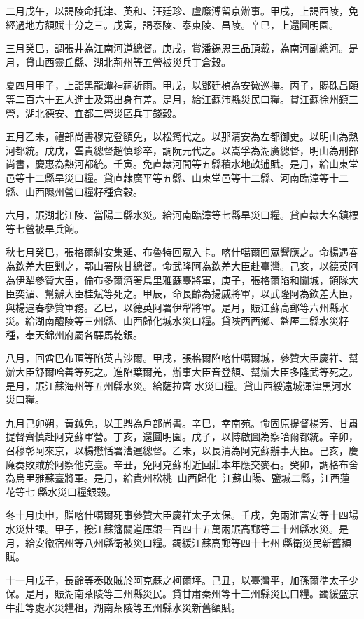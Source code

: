 \begin{pinyinscope}
二月戊午，以謁陵命托津、英和、汪廷珍、盧廕溥留京辦事。甲戌，上謁西陵，免經過地方額賦十分之三。戊寅，謁泰陵、泰東陵、昌陵。辛巳，上還圓明園。

三月癸巳，調張井為江南河道總督。庚戌，賞潘錫恩三品頂戴，為南河副總河。是月，貸山西靈丘縣、湖北荊州等五營被災兵丁倉穀。

夏四月甲子，上詣黑龍潭神祠祈雨。甲戌，以鄧廷楨為安徽巡撫。丙子，賜硃昌頤等二百六十五人進士及第出身有差。是月，給江蘇沛縣災民口糧。貸江蘇徐州鎮三營，湖北德安、宜都二營災區兵丁錢穀。

五月乙未，禮部尚書穆克登額免，以松筠代之。以那清安為左都御史。以明山為熱河都統。戊戌，雲貴總督趙慎畛卒，調阮元代之。以嵩孚為湖廣總督，明山為刑部尚書，慶惠為熱河都統。壬寅。免直隸河間等五縣積水地畝逋賦。是月，給山東堂邑等十二縣旱災口糧。貸直隸廣平等五縣、山東堂邑等十二縣、河南臨漳等十二縣、山西隰州營口糧籽種倉穀。

六月，賑湖北江陵、當陽二縣水災。給河南臨漳等七縣旱災口糧。貸直隸大名鎮標等七營被旱兵餉。

秋七月癸巳，張格爾糾安集延、布魯特回眾入卡。喀什噶爾回眾響應之。命楊遇春為欽差大臣剿之，鄂山署陜甘總督。命武隆阿為欽差大臣赴臺灣。己亥，以德英阿為伊犁參贊大臣，倫布多爾濟署烏里雅蘇臺將軍，庚子，張格爾陷和闐城，領隊大臣奕湄、幫辦大臣桂斌等死之。甲辰，命長齡為揚威將軍，以武隆阿為欽差大臣，與楊遇春參贊軍務。乙巳，以德英阿署伊犁將軍。是月，賑江蘇高郵等六州縣水災。給湖南醴陵等三州縣、山西歸化城水災口糧。貸陜西西鄉、盩厔二縣水災籽種，奉天錦州府屬各驛馬乾銀。

八月，回酋巴布頂等陷英吉沙爾。甲戌，張格爾陷喀什噶爾城，參贊大臣慶祥、幫辦大臣舒爾哈善等死之。進陷葉爾羌，辦事大臣音登額、幫辦大臣多隆武等死之。是月，賑江蘇海州等五州縣水災。給薩拉齊水災口糧。貸山西綏遠城渾津黑河水災口糧。

九月己卯朔，黃鉞免，以王鼎為戶部尚書。辛巳，幸南苑。命固原提督楊芳、甘肅提督齊慎赴阿克蘇軍營。丁亥，還圓明園。戊子，以博啟圖為察哈爾都統。辛卯，召穆彰阿來京，以楊懋恬署漕運總督。乙未，以長清為阿克蘇辦事大臣。己亥，慶廉奏敗賊於阿察他克臺。辛丑，免阿克蘇附近回莊本年應交麥石。癸卯，調格布舍為烏里雅蘇臺將軍。是月，給貴州松桃，山西歸化，江蘇山陽、鹽城二縣，江西蓮花等七縣水災口糧銀穀。

冬十月庚申，贈喀什噶爾死事參贊大臣慶祥太子太保。壬戌，免兩淮富安等十四場水災灶課。甲子，撥江蘇籓關道庫銀一百四十五萬兩賑高郵等二十州縣水災。是月，給安徽宿州等八州縣衛被災口糧。蠲緩江蘇高郵等四十七州縣衛災民新舊額賦。

十一月戊子，長齡等奏敗賊於阿克蘇之柯爾坪。己丑，以臺灣平，加孫爾準太子少保。是月，賑湖南茶陵等三州縣災民。貸甘肅秦州等十三州縣災民口糧。蠲緩盛京牛莊等處水災糧租，湖南茶陵等五州縣水災新舊額賦。


\end{pinyinscope}
